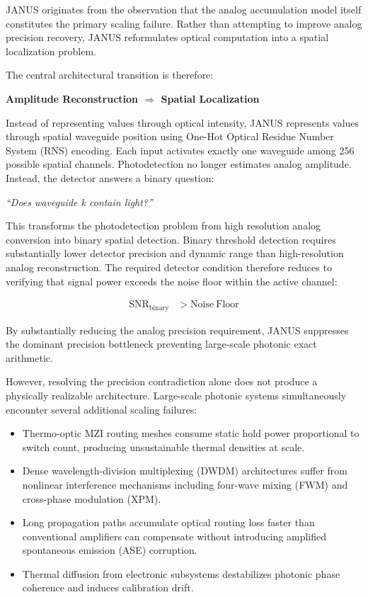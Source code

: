 \documentclass[journal]{IEEEtran}
\begin{document}
JANUS originates from the observation that the analog accumulation model itself constitutes the primary scaling failure. Rather than attempting to improve analog precision recovery, JANUS reformulates optical computation into a spatial localization problem.

The central architectural transition is therefore: 

\begin{center}
\textbf{Amplitude Reconstruction $\Longrightarrow$ Spatial Localization}
\end{center}

Instead of representing values through optical intensity, JANUS represents values through spatial waveguide position using One-Hot Optical Residue Number System (RNS) encoding. Each input activates exactly one waveguide among 256 possible spatial channels. Photodetection no longer estimates analog amplitude. Instead, the detector answers a binary question:

\begin{center}
\textit{``Does waveguide k contain light?''}
\end{center}

This transforms the photodetection problem from high resolution analog conversion into binary spatial detection. Binary threshold detection requires substantially lower detector precision and dynamic range than high-resolution analog reconstruction. The required detector condition therefore reduces to verifying that signal power exceeds the noise floor within the active channel:

\begin{align}
\mathrm{SNR}_{\mathrm{binary}}
&>
\mathrm{Noise\ Floor}
\label{eq:binary_requirement}
\end{align}

By substantially reducing the analog precision requirement, JANUS suppresses the dominant precision bottleneck preventing large-scale photonic exact arithmetic.

However, resolving the precision contradiction alone does not produce a physically realizable architecture. Large-scale photonic systems simultaneously encounter several additional scaling failures:

\begin{itemize}
\item  Thermo-optic MZI routing meshes consume static hold power proportional to switch count, producing unsustainable thermal densities at scale.
\item  Dense wavelength-division multiplexing (DWDM) architectures suffer from nonlinear interference mechanisms including four-wave mixing (FWM) and cross-phase modulation (XPM).
\item  Long propagation paths accumulate optical routing loss faster than conventional amplifiers can compensate without introducing amplified spontaneous emission (ASE) corruption.
\item  Thermal diffusion from electronic subsystems destabilizes photonic phase coherence and induces calibration drift.
\end{itemize}
\end{document}
